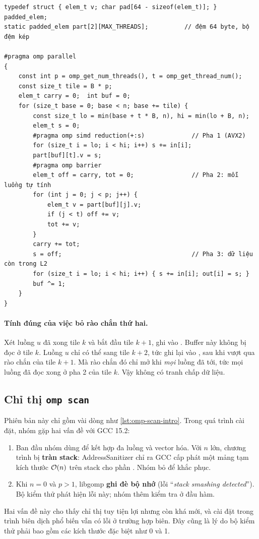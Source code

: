 \begin{lstlisting}[caption={Blocked-opt: tile vừa L2, một barrier mỗi tile.},label={lst:blockedopt}]
typedef struct { elem_t v; char pad[64 - sizeof(elem_t)]; } padded_elem;
static padded_elem part[2][MAX_THREADS];          // đệm 64 byte, bộ đệm kép

#pragma omp parallel
{
    const int p = omp_get_num_threads(), t = omp_get_thread_num();
    const size_t tile = B * p;
    elem_t carry = 0;  int buf = 0;
    for (size_t base = 0; base < n; base += tile) {
        const size_t lo = min(base + t * B, n), hi = min(lo + B, n);
        elem_t s = 0;
        #pragma omp simd reduction(+:s)             // Pha 1 (AVX2)
        for (size_t i = lo; i < hi; i++) s += in[i];
        part[buf][t].v = s;
        #pragma omp barrier
        elem_t off = carry, tot = 0;                // Pha 2: mỗi luồng tự tính
        for (int j = 0; j < p; j++) {
            elem_t v = part[buf][j].v;
            if (j < t) off += v;
            tot += v;
        }
        carry += tot;
        s = off;                                    // Pha 3: dữ liệu còn trong L2
        for (size_t i = lo; i < hi; i++) { s += in[i]; out[i] = s; }
        buf ^= 1;
    }
}
\end{lstlisting}

\paragraph{Tính đúng của việc bỏ rào chắn thứ hai.} Xét luồng \(u\) đã xong tile \(k\) và bắt
đầu tile \(k+1\), ghi vào . Buffer này không bị đọc ở tile \(k\). Luồng
\(u\) chỉ có thể sang tile \(k+2\), tức ghi lại vào , sau khi vượt qua rào
chắn của tile \(k+1\). Mà rào chắn đó chỉ mở khi \emph{mọi} luồng đã tới, tức mọi luồng đã đọc
xong  ở pha 2 của tile \(k\). Vậy không có tranh chấp dữ liệu.

\subsection{Chỉ thị \texttt{omp scan}}

Phiên bản này chỉ gồm vài dòng như \cref{lst:omp-scan-intro}. Trong quá trình cài đặt, nhóm gặp
hai vấn đề với GCC 15.2:
\begin{enumerate}
  \item Ban đầu nhóm dùng  để kết hợp đa luồng và
        vector hóa. Với \(n\) lớn, chương trình bị \textbf{tràn stack}: AddressSanitizer chỉ ra
        GCC cấp phát một mảng tạm kích thước \(\mathcal{O}(n)\) trên stack cho phần . Nhóm bỏ
         để khắc phục.
  \item Khi \(n = 0\) và \(p > 1\), libgomp \textbf{ghi đè bộ nhớ} (lỗi
        ``\emph{stack smashing detected}''). Bộ kiểm thử phát hiện lỗi này; nhóm thêm kiểm tra
         ở đầu hàm.
\end{enumerate}
Hai vấn đề này cho thấy chỉ thị  tuy tiện lợi nhưng còn khá mới, và cài đặt trong
trình biên dịch phổ biến vẫn có lỗi ở trường hợp biên. Đây cũng là lý do bộ kiểm thử phải bao
gồm các kích thước đặc biệt như 0 và 1.

